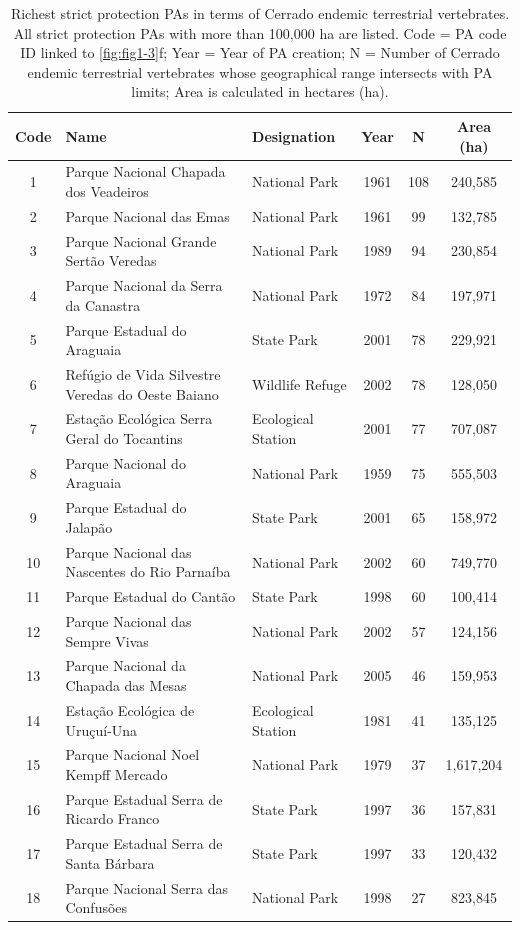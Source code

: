 \documentclass[12pt,openright,oneside,a4paper,english]{abntex2}
\begin{document}
\begin{table}[h]
	\centering
	\caption[Richest Cerrado Strict Protected Areas]{Richest strict protection PAs in terms of Cerrado endemic terrestrial vertebrates. All strict protection PAs with more than 100,000 ha are listed. Code = PA code ID linked to \autoref{fig:fig1-3}f; Year = Year of PA creation; N = Number of Cerrado endemic terrestrial vertebrates whose geographical range intersects with PA limits; Area is calculated in hectares (ha).}
	\label{tab:tab1-1}
	\vspace{\bigskipamount}
	\footnotesize
	\begin{tabular}{cllccc}
		\hline
		Code & Name & Designation & Year & N & Area (ha) \\
		\hline
		1 & Parque Nacional Chapada dos Veadeiros & National Park & 1961 & 108 & 240,585 \\
		2 & Parque Nacional das Emas & National Park & 1961 & 99 & 132,785 \\
		3 & Parque Nacional Grande Sertão Veredas & National Park & 1989 & 94 & 230,854 \\
		4 & Parque Nacional da Serra da Canastra & National Park & 1972 & 84 & 197,971 \\
		5 & Parque Estadual do Araguaia & State Park & 2001 & 78 & 229,921 \\
		6 & Refúgio de Vida Silvestre Veredas do Oeste Baiano & Wildlife Refuge & 2002 & 78 & 128,050 \\
		7 & Estação Ecológica Serra Geral do Tocantins & Ecological Station & 2001 & 77 & 707,087 \\
		8 & Parque Nacional do Araguaia & National Park & 1959 & 75 & 555,503 \\
		9 & Parque Estadual do Jalapão & State Park & 2001 & 65 & 158,972 \\
		10 & Parque Nacional das Nascentes do Rio Parnaíba & National Park & 2002 & 60 & 749,770 \\
		11 & Parque Estadual do Cantão & State Park & 1998 & 60 & 100,414 \\
		12 & Parque Nacional das Sempre Vivas & National Park & 2002 & 57 & 124,156 \\
		13 & Parque Nacional da Chapada das Mesas & National Park & 2005 & 46 & 159,953 \\
		14 & Estação Ecológica de Uruçuí-Una & Ecological Station & 1981 & 41 & 135,125 \\
		15 & Parque Nacional Noel Kempff Mercado & National Park & 1979 & 37 & 1,617,204 \\
		16 & Parque Estadual Serra de Ricardo Franco & State Park & 1997 & 36 & 157,831 \\
		17 & Parque Estadual Serra de Santa Bárbara & State Park & 1997 & 33 & 120,432 \\
		18 & Parque Nacional Serra das Confusões & National Park & 1998 & 27 & 823,845 \\
		\hline
	\end{tabular}
\end{table}
\end{document}
